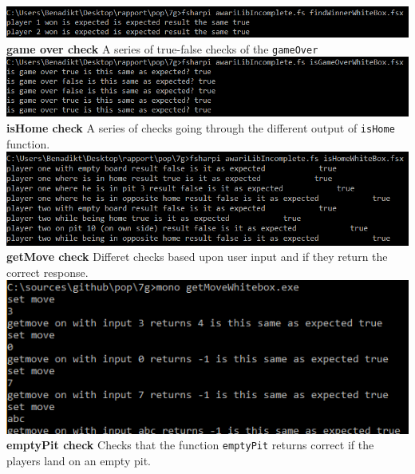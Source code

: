 \documentclass{article}
\begin{document}
        \includegraphics[scale=0.587]{findWinnerWhiteBox.png}
        \\
         \textbf{game over check}\newline
        A series of true-false checks of the \verb|gameOver| 
        \\
        \includegraphics[scale=0.587]{isGameOverWhiteBox.png}
        \\
        \textbf{isHome check}\newline
       A series of checks going through the different output of \verb|isHome| function. 
        \\
        \includegraphics[scale=0.613]{isHomeWhiteBox.png}
        \\
        \newpage
        \textbf{getMove check}\newline
        Differet checks based upon user input and if they return the correct response. 
        \\
        \includegraphics[scale=0.5]{getMoveWhiteBox.png}
        \\
        \textbf{emptyPit check}\newline
        Checks that the function \verb|emptyPit| returns correct if the players land on an empty pit.
        \\
\end{document}
